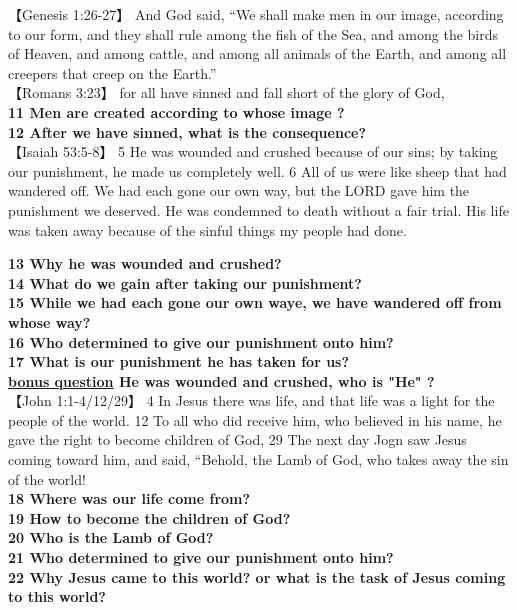 【Genesis 1:26-27】 And God said, “We shall make men in our image, according to our form, and they shall rule among the fish of the Sea, and among the birds of Heaven, and among cattle, and among all animals of the Earth, and among all creepers that creep on the Earth.”\\
【Romans 3:23】 for all have sinned and fall short of the glory of God, \\

\textbf{11 Men are created according to whose image ?}\\
\textbf{12 After we have sinned, what is the consequence?}\\


【Isaiah 53:5-8】 5 He was wounded and crushed because of our sins; by taking our punishment, he made us completely well. 6 All of us were like sheep that had wandered off.  We had each gone our own way, but the LORD gave him the punishment we deserved. He was condemned to death without a fair trial. His life was taken away because of the sinful things my people had done.

\textbf{13 Why he was wounded and crushed?}\\
\textbf{14 What do we gain after taking our punishment?}\\
\textbf{15 While we had each gone our own waye, we have wandered off from whose way?}\\
\textbf{16 Who determined to give our punishment onto him?}\\
\textbf{17 What is our punishment he has taken for us?}\\

\textbf{\underline{bonus question} He was wounded and crushed, who is "He" ?}\\


【John 1:1-4/12/29】 4 In Jesus there was life, and that life was a light for the people of the world. 12 To all who did receive him, who believed in his name, he gave the right to become children of God, 29 The next day Jogn saw Jesus coming toward him, and said, “Behold, the Lamb of God, who takes away the sin of the world!\\

\textbf{18 Where was our life come from?}\\
\textbf{19 How to become the children of God?}\\
\textbf{20 Who is the Lamb of God?}\\
\textbf{21 Who determined to give our punishment onto him?}\\
\textbf{22 Why Jesus came to this world? or what is the task of Jesus coming to this world?}\\


